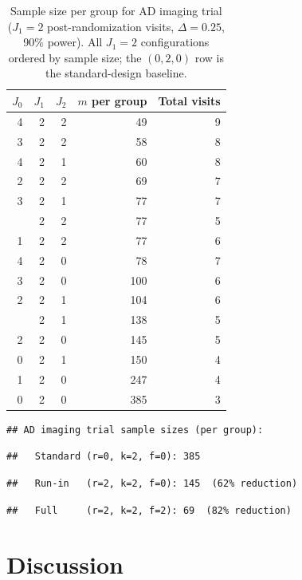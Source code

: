 \documentclass[
  11pt,
]{article}
\begin{document}
\begin{table}

\caption{\label{tab:ad-example}Sample size per group for AD imaging trial ($J_1=2$ post-randomization visits, $\Delta = 0.25$, 90\% power). All $J_1=2$ configurations ordered by sample size; the $(0, 2, 0)$ row is the standard-design baseline.}
\centering
\begin{tabular}[t]{rrrrr}
\toprule
$J_0$ & $J_1$ & $J_2$ & $m$ per group & Total visits\\
\midrule
4 & 2 & 2 & 49 & 9\\
3 & 2 & 2 & 58 & 8\\
4 & 2 & 1 & 60 & 8\\
2 & 2 & 2 & 69 & 7\\
3 & 2 & 1 & 77 & 7\\
\addlinespace
0 & 2 & 2 & 77 & 5\\
1 & 2 & 2 & 77 & 6\\
4 & 2 & 0 & 78 & 7\\
3 & 2 & 0 & 100 & 6\\
2 & 2 & 1 & 104 & 6\\
\addlinespace
1 & 2 & 1 & 138 & 5\\
2 & 2 & 0 & 145 & 5\\
0 & 2 & 1 & 150 & 4\\
1 & 2 & 0 & 247 & 4\\
0 & 2 & 0 & 385 & 3\\
\bottomrule
\end{tabular}
\end{table}

\begin{verbatim}
## AD imaging trial sample sizes (per group):
\end{verbatim}

\begin{verbatim}
##   Standard (r=0, k=2, f=0): 385
\end{verbatim}

\begin{verbatim}
##   Run-in   (r=2, k=2, f=0): 145  (62% reduction)
\end{verbatim}

\begin{verbatim}
##   Full     (r=2, k=2, f=2): 69  (82% reduction)
\end{verbatim}

\section{Discussion}\label{discussion}
\end{document}
